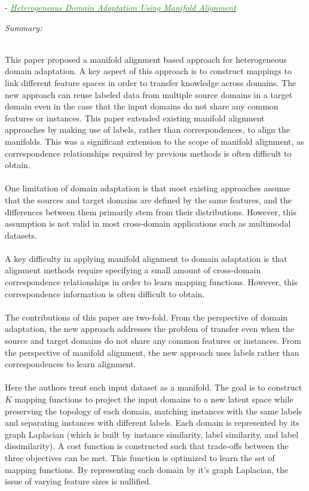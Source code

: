 \documentclass[]{article}
\newcommand{\paperentry}[4]{
            \hangindent=1cm
            \cite{#1} - \href{run:../References/#3}{\textcolor{ForestGreen}{\textit{#2}}}
            
            \noindent            
            \begin{minipage}[t]{0.1\linewidth}\hfill\end{minipage}
            \begin{minipage}[t]{0.8\linewidth}\textcolor{NavyBlue}{{\textit{Summary:}}}#4\end{minipage}
            \vspace{.25cm}
          }
\begin{document}
		\paperentry{Wang2011HeteroDomainAdaptationManAlignment}
		{Heterogeneous Domain Adaptation Using Manifold Alignment}
		{Manifold_Representation_Learning/Alignment/Wang2011HeteroDomainAdaptationManAlignment.pdf}
		{} \\
		This paper proposed a manifold alignment based approach for heterogeneous domain adaptation.  A key aspect of this approach is to construct mappings to link different feature spaces in order to transfer knowledge across domains.  The new approach can reuse labeled data from multiple source domains in a target domain even in the case that the input domains do not share any common features or instances.  This paper extended existing manifold alignment approaches by making use of labels, rather than correspondences, to align the manifolds.  This was a significant extension to the scope of manifold alignment, as correspondence relationships required by previous methods is often difficult to obtain. \\ \\
		One limitation of domain adaptation is that most existing approaches assume that the sources and target domains are defined by the same features, and the differences between them primarily stem from their distributions.  However, this assumption is not valid in most cross-domain applications such as multimodal datasets.
		\\ \\
		A key difficulty in applying manifold alignment to domain adaptation is that alignment methods require specifying a small amount of cross-domain correspondence relationships in order to learn mapping functions.  However, this correspondence information is often difficult to obtain.
		\\ \\
		The contributions of this paper are two-fold.  From the perspective of domain adaptation, the new approach addresses the problem of transfer even when the source and target domains do not share any common features or instances.  From the perspective of manifold alignment, the new  approach uses labels rather than correspondences to learn alignment.
		\\ \\
		Here the authors treat each input dataset as a manifold.  The goal is to construct $K$ mapping functions to project the input domains to a new latent space while preserving the topology of each domain, matching instances with the same labels and separating instances with different labels.  Each domain is represented by its graph Laplacian (which is built by instance similarity, label similarity, and label dissimilarity).  A cost function is constructed such that trade-offs between the three objectives can be met.  This function is optimized to learn the set of mapping functions. By representing each domain by it's graph Laplacian, the issue of varying feature sizes is nullified. \\
		
\end{document}
